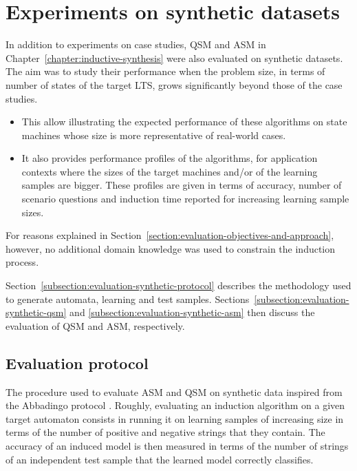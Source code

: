 \section{Experiments on synthetic datasets\label{section:evaluation-experiments-on-synthetic-data}}

In addition to experiments on case studies, QSM and ASM in Chapter~\ref{chapter:inductive-synthesis} were also evaluated on synthetic datasets. The aim was to study their performance when the problem size, in terms of number of states of the target LTS, grows significantly beyond those of the case studies. 
\begin{itemize}
\item This allow illustrating the expected performance of these algorithms on state machines whose size is more representative of real-world cases. 
\item It also provides performance profiles of the algorithms, for application contexts where the sizes of the target machines and/or of the learning samples are bigger. These profiles are given in terms of accuracy, number of scenario questions and induction time reported for increasing learning sample sizes.
\end{itemize}

For reasons explained in Section~\ref{section:evaluation-objectives-and-approach}, however, no additional domain knowledge was used to constrain the induction process.

Section~\ref{subsection:evaluation-synthetic-protocol} describes the methodology used to generate automata, learning and test samples. Sections~\ref{subsection:evaluation-synthetic-qsm} and \ref{subsection:evaluation-synthetic-asm} then discuss the evaluation of QSM and ASM, respectively.

\subsection{Evaluation protocol\label{subsection:evaluation-synthetic-protocol}}

The procedure used to evaluate ASM and QSM on synthetic data inspired from the Abbadingo protocol \cite{Lang:1998}. Roughly, evaluating an induction algorithm on a given target automaton consists in running it on learning samples of increasing size in terms of the number of positive and negative strings that they contain. The accuracy of an induced model is then measured in terms of the number of strings of an independent test sample that the learned model correctly classifies.

